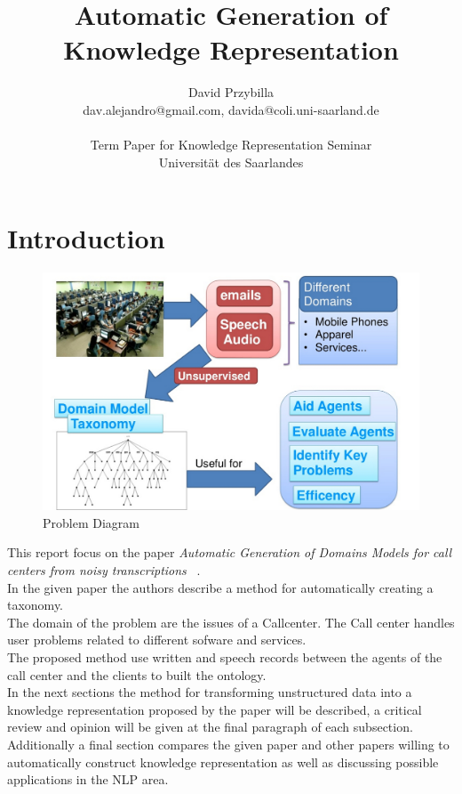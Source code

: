 \documentclass[4pt,a4paper]{article}
\author{David Przybilla\\dav.alejandro@gmail.com, davida@coli.uni-saarland.de\\ \\ Term Paper for Knowledge Representation Seminar\\ Universit\"{a}t des Saarlandes}
\title{Automatic Generation of Knowledge Representation}
\begin{document}
    \maketitle




\section{Introduction}


\begin{figure}[]
  \centering
    \includegraphics[scale=0.2]{pics/problem.jpg}
    \caption{Problem Diagram}
   \label{fig:problem}  
\end{figure}



This report focus on the paper \textit{Automatic Generation of Domains Models for call centers from noisy transcriptions} ~\cite{Roy:2006:AGD:1220175.1220268}.\\
In the given paper the authors describe a method for automatically creating a taxonomy.\\
The domain of the problem are the issues of a Callcenter. The Call center handles user problems related to different sofware and services.\\
The proposed method use  written and speech records between the agents of the call center and the clients to built the ontology. \\
In the next sections  the method for transforming unstructured data into a knowledge representation proposed by the paper will be described, a critical review and opinion will be given at the final paragraph of each subsection. Additionally a final section compares the given paper and other papers willing to automatically construct knowledge representation as well as discussing possible applications in the NLP area.
\end{document}
